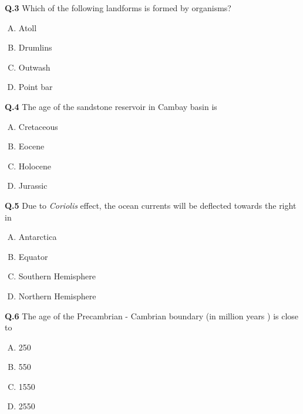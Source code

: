 \textbf{Q.3} Which of the following landforms is formed by organisms?

\begin{multicols}{4}
    

\begin{enumerate}[(A)]
\item Atoll \item  Drumlins \item   Outwash \item  Point bar
\end{enumerate}
\end{multicols}

\textbf{Q.4} The age of the sandstone reservoir in Cambay basin is

\begin{multicols}{4}

\begin{enumerate}[(A)]
\item Cretaceous \item   Eocene \item   Holocene \item   Jurassic
\end{enumerate}
\end{multicols}

\textbf{Q.5} Due to \textit{Coriolis} effect, the ocean currents will be deflected towards the right in

\begin{multicols}{4}



\begin{enumerate}[(A)]
\item Antarctica \item Equator
\item Southern Hemisphere \item Northern Hemisphere
\end{enumerate}
\end{multicols}

\textbf{Q.6} The age of the Precambrian - Cambrian boundary (in million years ) is close to

\begin{multicols}{4}


\begin{enumerate}[(A)]
\item 250 \item   550
\item1550 \item 2550
\end{enumerate}
\end{multicols}

